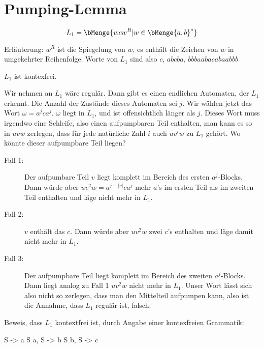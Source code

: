 \documentclass{bschlangaul-aufgabe}
\begin{document}
\section{Pumping-Lemma
}


\begin{liExkurs}
\bPumpingRegulaer
\end{liExkurs}

\begin{displaymath}
L_1 = \bMenge{ w c w^R | w \in \bMenge{a, b}^* }
\end{displaymath}

\noindent
Erläuterung: $w^R$ ist die Spiegelung von $w$, \dh es enthält die
Zeichen von $w$ in umgekehrter Reihenfolge. Worte von $L_1$ sind also
\zB $c$, $abcba$, $bbbaabacabaabbb$

\begin{bAntwort}
$L_1$ ist kontexfrei.


\noindent
Wir nehmen an $L_1$ wäre regulär. Dann gibt es einen endlichen
Automaten, der $L_1$ erkennt. Die Anzahl der Zustände dieses Automaten
sei $j$. Wir wählen jetzt das Wort $\omega = a^j c a^j$. $\omega$ liegt
in $L_1$, und ist offensichtlich länger als $j$. Dieses Wort muss
irgendwo eine Schleife, also einen aufpumpbaren Teil enthalten, \dh
man kann es so in $uvw$ zerlegen, dass für jede natürliche Zahl $i$ auch
$uv^iw$ zu $L_1$ gehört. Wo könnte dieser aufpumpbare Teil liegen?

\begin{description}
\item[Fall 1:]

Der aufpumbare Teil $v$ liegt komplett im Bereich des ersten
$a^j$-Blocks. Dann würde aber $uv^2w = a^{j + |v|} c a^j$ mehr $a$’s im
ersten Teil als im zweiten Teil enthalten und läge nicht mehr in $L_1$.

\item[Fall 2:]

$v$ enthält das $c$. Dann würde aber $u v^2 w$ zwei $c$’s enthalten und
läge damit nicht mehr in $L_1$.

\item[Fall 3:]

Der aufpumpbare Teil liegt komplett im Bereich des zweiten $a^j$-Blocks.
Dann liegt analog zu Fall 1 $u v^2 w$ nicht mehr in $L_1$. Unser Wort
lässt sich also nicht so zerlegen, dass man den Mittelteil aufpumpen
kann, also ist die Annahme, dass $L_1$ regulär ist, falsch.
\end{description}
\noindent
Beweis, dass $L_1$ kontextfrei ist, durch Angabe einer kontexfreien
Grammatik:

\noindent
\begin{liProduktionsRegeln}
S -> a S a,
S -> b S b,
S -> c
\end{liProduktionsRegeln}
\end{bAntwort}
\end{document}
